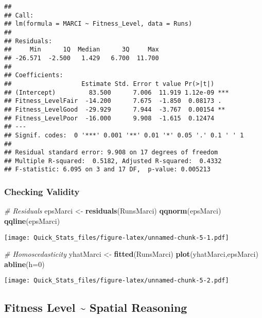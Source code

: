 \documentclass[]{article}
\newenvironment{Shaded}{\begin{snugshade}}{\end{snugshade}}
\newcommand{\KeywordTok}[1]{\textcolor[rgb]{0.13,0.29,0.53}{\textbf{#1}}}
\newcommand{\DataTypeTok}[1]{\textcolor[rgb]{0.13,0.29,0.53}{#1}}
\newcommand{\DecValTok}[1]{\textcolor[rgb]{0.00,0.00,0.81}{#1}}
\newcommand{\StringTok}[1]{\textcolor[rgb]{0.31,0.60,0.02}{#1}}
\newcommand{\CommentTok}[1]{\textcolor[rgb]{0.56,0.35,0.01}{\textit{#1}}}
\newcommand{\NormalTok}[1]{#1}
\begin{document}
\begin{verbatim}
## 
## Call:
## lm(formula = MARCI ~ Fitness_Level, data = Runs)
## 
## Residuals:
##     Min      1Q  Median      3Q     Max 
## -26.571  -2.500   1.429   6.700  11.700 
## 
## Coefficients:
##                   Estimate Std. Error t value Pr(>|t|)    
## (Intercept)         83.500      7.006  11.919 1.12e-09 ***
## Fitness_LevelFair  -14.200      7.675  -1.850  0.08173 .  
## Fitness_LevelGood  -29.929      7.944  -3.767  0.00154 ** 
## Fitness_LevelPoor  -16.000      9.908  -1.615  0.12474    
## ---
## Signif. codes:  0 '***' 0.001 '**' 0.01 '*' 0.05 '.' 0.1 ' ' 1
## 
## Residual standard error: 9.908 on 17 degrees of freedom
## Multiple R-squared:  0.5182, Adjusted R-squared:  0.4332 
## F-statistic: 6.095 on 3 and 17 DF,  p-value: 0.005213
\end{verbatim}

\subsubsection{Checking Validity}\label{checking-validity}

\begin{Shaded}
\begin{Highlighting}[]
\CommentTok{# Residuals }
\NormalTok{epsMarci <-}\StringTok{ }\KeywordTok{residuals}\NormalTok{(RunsMarci) }
\KeywordTok{qqnorm}\NormalTok{(epsMarci) }
\KeywordTok{qqline}\NormalTok{(epsMarci) }
\end{Highlighting}
\end{Shaded}

\texttt{[image: Quick\_Stats\_files/figure-latex/unnamed-chunk-5-1.pdf]}

\begin{Shaded}
\begin{Highlighting}[]
\CommentTok{# Homoscedasticity }
\NormalTok{yhatMarci <-}\StringTok{ }\KeywordTok{fitted}\NormalTok{(RunsMarci) }
\KeywordTok{plot}\NormalTok{(yhatMarci,epsMarci) }
\KeywordTok{abline}\NormalTok{(}\DataTypeTok{h=}\DecValTok{0}\NormalTok{) }
\end{Highlighting}
\end{Shaded}

\texttt{[image: Quick\_Stats\_files/figure-latex/unnamed-chunk-5-2.pdf]}

\subsection{Fitness Level \textasciitilde{} Spatial
Reasoning}\label{fitness-level-spatial-reasoning}
\end{document}
